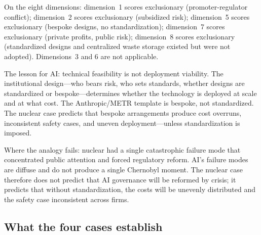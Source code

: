 On the eight dimensions: dimension~1 scores exclusionary (promoter-regulator conflict); dimension~2 scores exclusionary (subsidized risk); dimension~5 scores exclusionary (bespoke designs, no standardization); dimension~7 scores exclusionary (private profits, public risk); dimension~8 scores exclusionary (standardized designs and centralized waste storage existed but were not adopted). Dimensions~3 and 6 are not applicable.

The lesson for AI: technical feasibility is not deployment viability. The institutional design---who bears risk, who sets standards, whether designs are standardized or bespoke---determines whether the technology is deployed at scale and at what cost. The Anthropic/METR template is bespoke, not standardized. The nuclear case predicts that bespoke arrangements produce cost overruns, inconsistent safety cases, and uneven deployment---unless standardization is imposed.

Where the analogy fails: nuclear had a single catastrophic failure mode that concentrated public attention and forced regulatory reform. AI's failure modes are diffuse and do not produce a single Chernobyl moment. The nuclear case therefore does not predict that AI governance will be reformed by crisis; it predicts that without standardization, the costs will be unevenly distributed and the safety case inconsistent across firms.

\subsection{What the four cases establish}

